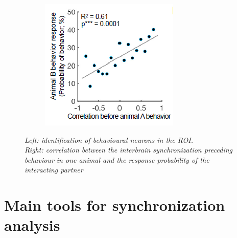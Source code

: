 \documentclass[a4paper]{article}
\begin{document}
\begin{figure}[H]
\begin{minipage}{\linewidth}
\begin{minipage}{0.4\linewidth}
\begin{figure}[H]
			\end{figure}
		\end{minipage}
		\hspace{0.05\linewidth}
		\begin{minipage}{0.5\linewidth}
			\begin{figure}[H]
				\includegraphics[width=\linewidth]{kingsbury3.png}
				
			\end{figure}
		\end{minipage}
		
	\end{minipage}
	\caption{\textit{Left: identification of behavioural neurons in the ROI. \\
			Right: correlation between the interbrain synchronization preceding behaviour in one animal and the response probability of the interacting partner}}
\end{figure}

\newpage



\section{Main tools for synchronization analysis}
\end{document}
